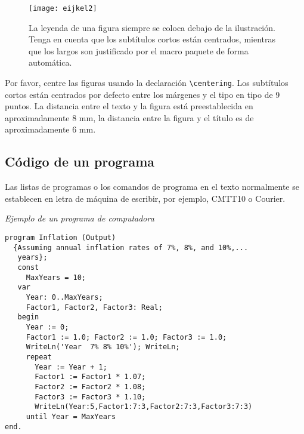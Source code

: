 \documentclass[runningheads,a4paper]{llncs}
\begin{document}
\begin{figure}
\centering
\texttt{[image: eijkel2]}
\caption{La leyenda de una figura siempre se coloca debajo de la ilustración. Tenga en cuenta que los subtítulos cortos están centrados, mientras que los largos son justificado por el macro paquete de forma automática.}
\label{fig:ejemplo}
\end{figure}

Por favor, centre las figuras usando la declaración \verb+\centering+. Los subtítulos cortos están centrados por defecto entre los márgenes y el tipo en tipo de 9 puntos. La distancia entre el texto y la figura está preestablecida en aproximadamente 8 mm, la distancia entre la figura y el título es de aproximadamente 6 mm.

\subsection{C\'{o}digo de un programa}

Las listas de programas o los comandos de programa en el texto normalmente se establecen en letra de máquina de escribir, por ejemplo, CMTT10 o Courier.

\medskip
\noindent
\textit{Ejemplo de un programa de computadora}
\begin{verbatim}
program Inflation (Output)
  {Assuming annual inflation rates of 7%, 8%, and 10%,...
   years};
   const
     MaxYears = 10;
   var
     Year: 0..MaxYears;
     Factor1, Factor2, Factor3: Real;
   begin
     Year := 0;
     Factor1 := 1.0; Factor2 := 1.0; Factor3 := 1.0;
     WriteLn('Year  7% 8% 10%'); WriteLn;
     repeat
       Year := Year + 1;
       Factor1 := Factor1 * 1.07;
       Factor2 := Factor2 * 1.08;
       Factor3 := Factor3 * 1.10;
       WriteLn(Year:5,Factor1:7:3,Factor2:7:3,Factor3:7:3)
     until Year = MaxYears
end.
\end{verbatim}




\end{document}
